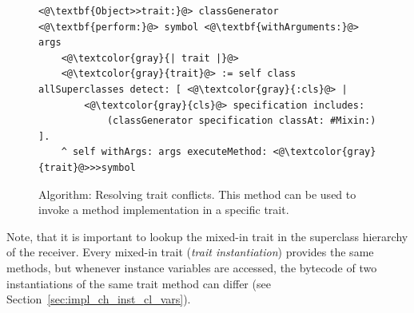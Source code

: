 \begin{figure}[!htp]
\begin{lstlisting}
<@\textbf{Object>>trait:}@> classGenerator <@\textbf{perform:}@> symbol <@\textbf{withArguments:}@> args
    <@\textcolor{gray}{| trait |}@>
    <@\textcolor{gray}{trait}@> := self class allSuperclasses detect: [ <@\textcolor{gray}{:cls}@> |
        <@\textcolor{gray}{cls}@> specification includes: 
            (classGenerator specification classAt: #Mixin:) ].
    ^ self withArgs: args executeMethod: <@\textcolor{gray}{trait}@>>>symbol
\end{lstlisting}
\caption[Algorithm: Resolving trait conflicts]{Algorithm: Resolving trait conflicts. This method can be used to invoke a method implementation in a specific trait.}
\label{fig:algo_trait_res}
\end{figure}

Note, that it is important to lookup the mixed-in trait in the superclass hierarchy of the receiver. Every mixed-in trait (\emph{trait instantiation}) provides the same methods, but whenever instance variables are accessed, the bytecode of two instantiations of the same trait method can differ (see Section~\ref{sec:impl_ch_inst_cl_vars}).

